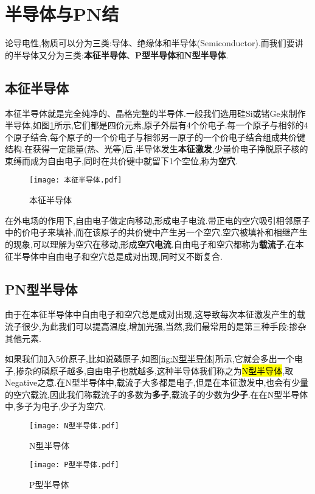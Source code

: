 \section{\K 半导体与PN结}
\Par 论导电性,物质可以分为三类:导体、绝缘体和半导体(Semiconductor).而我们要讲的半导体又分为三类:\textbf{本征半导体}、\textbf{P型半导体}和\textbf{N型半导体}.
\subsection{\K 本征半导体}

\Par 本征半导体就是完全纯净的、晶格完整的半导体.一般我们选用硅Si或锗Ge来制作半导体,如图\ref{fig:本征半导体}所示,它们都是四价元素,原子外层有4个价电子.每一个原子与相邻的4个原子结合,每个原子的一个价电子与相邻另一原子的一个价电子结合组成共价键结构.在获得一定能量(热、光等)后,半导体发生\textbf{本征激发},少量价电子挣脱原子核的束缚而成为自由电子,同时在共价键中就留下1个空位,称为\textbf{空穴}.
\begin{figure}[htbp]
	\centering
	\texttt{[image: 本征半导体.pdf]}
	\caption{本征半导体}
	\label{fig:本征半导体}
\end{figure}
\Par 在外电场的作用下,自由电子做定向移动,形成电子电流.带正电的空穴吸引相邻原子中的价电子来填补,而在该原子的共价键中产生另一个空穴.空穴被填补和相继产生的现象,可以理解为空穴在移动,形成\textbf{空穴电流}.自由电子和空穴都称为\textbf{载流子}.在本征半导体中自由电子和空穴总是成对出现,同时又不断复合.

\subsection{\K PN型半导体}
\Par 由于在本征半导体中自由电子和空穴总是成对出现,这导致每次本征激发产生的载流子很少,为此我们可以提高温度,增加光强,当然,我们最常用的是第三种手段:掺杂其他元素.

\Par 如果我们加入5价原子,比如说磷原子,如图\ref{fig:N型半导体}所示,它就会多出一个电子,掺杂的磷原子越多,自由电子也就越多,这种半导体我们称之为\hl{N型半导体},取Negative之意.在N型半导体中,载流子大多都是电子,但是在本征激发中,也会有少量的空穴载流,因此我们称载流子的多数为\textbf{多子},载流子的少数为\textbf{少子}.在在N型半导体中,多子为电子,少子为空穴.

\begin{figure}[htbp]
    \centering
    \begin{minipage}{0.48\textwidth}
        \centering
	    \texttt{[image: N型半导体.pdf]}
	    \caption{N型半导体}
	    \label{fig:N型半导体}
        \end{minipage}
    \begin{minipage}{0.48\textwidth}
        \centering
	    \texttt{[image: P型半导体.pdf]}
	    \caption{P型半导体}
	    \label{fig:P型半导体}
    \end{minipage}
\end{figure}

